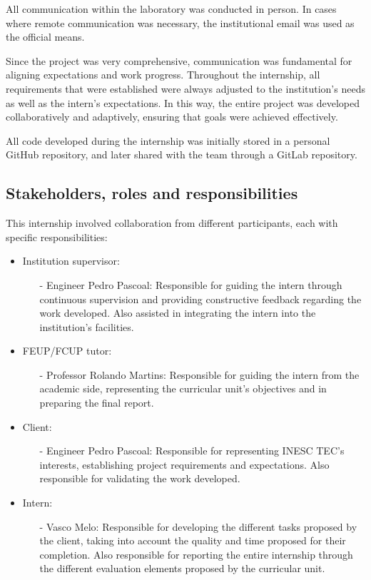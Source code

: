 All communication within the laboratory was conducted in person. In cases where remote communication was necessary, the institutional email was used as the official means.

Since the project was very comprehensive, communication was fundamental for aligning expectations and work progress. Throughout the internship, all requirements that were established were always adjusted to the institution's needs as well as the intern's expectations. In this way, the entire project was developed collaboratively and adaptively, ensuring that goals were achieved effectively.

All code developed during the internship was initially stored in a personal GitHub repository, and later shared with the team through a GitLab repository.

\subsection{Stakeholders, roles and responsibilities}
This internship involved collaboration from different participants, each with specific responsibilities:

\begin{itemize}
    \item Institution supervisor:
    \begin{itemize}
        \item[-] Engineer Pedro Pascoal: Responsible for guiding the intern through continuous supervision and providing constructive feedback regarding the work developed. Also assisted in integrating the intern into the institution's facilities.
    \end{itemize}
    \item FEUP/FCUP tutor:
    \begin{itemize}
        \item[-] Professor Rolando Martins: Responsible for guiding the intern from the academic side, representing the curricular unit's objectives and in preparing the final report.
    \end{itemize}
    \item Client:
    \begin{itemize}
        \item[-] Engineer Pedro Pascoal: Responsible for representing INESC TEC's interests, establishing project requirements and expectations. Also responsible for validating the work developed.
    \end{itemize}
    \item Intern:
    \begin{itemize}
        \item[-] Vasco Melo: Responsible for developing the different tasks proposed by the client, taking into account the quality and time proposed for their completion. Also responsible for reporting the entire internship through the different evaluation elements proposed by the curricular unit.
    \end{itemize}
\end{itemize}

